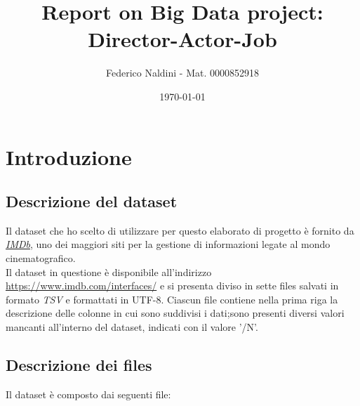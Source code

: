 \documentclass[hidelinks]{article}
\title{\textbf{Report on Big Data project: Director-Actor-Job}}
\author{
	Federico Naldini - Mat.  0000852918}
\date{\today}
\begin{document}
\maketitle
\newpage

\tableofcontents

\newpage

\section{Introduzione}
\subsection{Descrizione del dataset}
Il dataset che ho scelto di utilizzare per questo elaborato di progetto è fornito da \href{https://www.imdb.com/}{\textit{IMDb}}, uno dei maggiori siti per la gestione di informazioni legate al mondo cinematografico.\\
Il dataset in questione è disponibile all'indirizzo  \url{https://www.imdb.com/interfaces/} e si presenta diviso in sette files salvati in formato \textit{TSV} e formattati in UTF-8. Ciascun file contiene nella prima riga la descrizione delle colonne in cui sono suddivisi i dati;sono presenti diversi valori mancanti all'interno del dataset, indicati con il valore '/N'.



\subsection{Descrizione dei files}

Il dataset è composto dai seguenti file:
\end{document}
